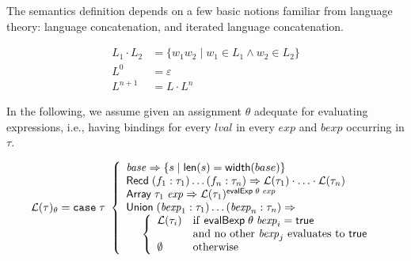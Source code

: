 \documentclass[svgnames]{llncs}
\newcommand{\ie}{i.e.}
\newcommand{\konst}[1]{\ensuremath{\mathsf{#1}}}
\newcommand{\set}[1]{\ensuremath{\{ {#1} \}}}
\newcommand{\Lang}[1]{\ensuremath{{\mathcal L}({#1})}}
\begin{document}
The semantics definition depends on a few basic notions familiar from
language theory: language concatenation, and iterated language
concatenation.

\begin{align*}
L_1 \cdot L_2 &= \set{w_1 w_2 \mid w_1 \in L_1 \land w_2 \in  L_2} \\
L^0 &= \varepsilon \\
L^{n+1} &= L \cdot L^n
\end{align*}


\begin{definition}

 In the following, we assume given an assignment $\theta$ adequate for
evaluating expressions, \ie, having bindings for every
$\mathit{lval}$ in every $\mathit{exp}$ and $\mathit{bexp}$
occurring in $\tau$.

\[
\Lang{\tau}_{\theta} =
\mathtt{case}\; \tau\
 \left\{
 \begin{array}{l}
 \mathit{base} \Rightarrow \set{s \mid \konst{len}(s) = \konst{width}(base)} \\
 \konst{Recd}\; (f_1 : \tau_1) \ldots (f_n : \tau_n)
      \Rightarrow \Lang{\tau_1} \cdot \ldots \cdot \Lang{\tau_n}
\\
 \konst{Array}\; \tau_1 \; \mathit{exp}
      \Rightarrow  \Lang{\tau_1}^{\konst{evalExp}\;\theta\;\mathit{exp}}
\\
 \konst{Union}\; (\mathit{bexp}_1 : \tau_1) \ldots (\mathit{bexp}_n : \tau_n) \Rightarrow \\
  \hspace*{5mm}
 \left\{
 \begin{array}{ll}
    \Lang{\tau_i} &  \mathrm{if}\ \konst{evalBexp}\;\theta\;\mathit{bexp}_i = \konst{true} \\
                  & \mathrm{and\ no\ other}\ \mathit{bexp}_j\ \mathrm{evaluates\ to}\ \konst{true}  \\
    \emptyset & \mathrm{otherwise}
 \end{array}
 \right.
 \\
\end{array}
 \right.
\]
\end{definition}
\end{document}
